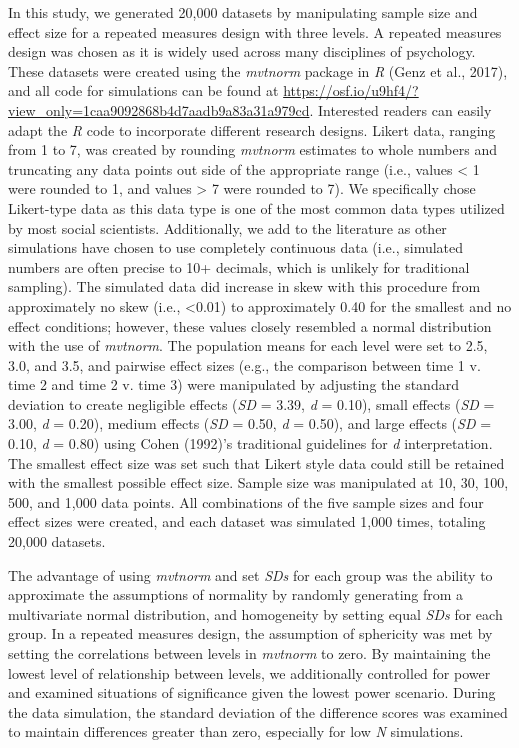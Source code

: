 \documentclass[english,mask,man]{apa6}
\theoremstyle{definition}
\theoremstyle{definition}
\theoremstyle{definition}
\theoremstyle{remark}
\begin{document}
In this study, we generated 20,000 datasets by manipulating sample size
and effect size for a repeated measures design with three levels. A
repeated measures design was chosen as it is widely used across many
disciplines of psychology. These datasets were created using the
\emph{mvtnorm} package in \emph{R} (Genz et al., 2017), and all code for
simulations can be found at
\url{https://osf.io/u9hf4/?view_only=1caa9092868b4d7aadb9a83a31a979cd}.
Interested readers can easily adapt the \emph{R} code to incorporate
different research designs. Likert data, ranging from 1 to 7, was
created by rounding \emph{mvtnorm} estimates to whole numbers and
truncating any data points out side of the appropriate range (i.e.,
values \textless{} 1 were rounded to 1, and values \textgreater{} 7 were
rounded to 7). We specifically chose Likert-type data as this data type
is one of the most common data types utilized by most social scientists.
Additionally, we add to the literature as other simulations have chosen
to use completely continuous data (i.e., simulated numbers are often
precise to 10+ decimals, which is unlikely for traditional sampling).
The simulated data did increase in skew with this procedure from
approximately no skew (i.e., \textless{}0.01) to approximately 0.40 for
the smallest and no effect conditions; however, these values closely
resembled a normal distribution with the use of \emph{mvtnorm}. The
population means for each level were set to 2.5, 3.0, and 3.5, and
pairwise effect sizes (e.g., the comparison between time 1 v. time 2 and
time 2 v. time 3) were manipulated by adjusting the standard deviation
to create negligible effects (\emph{SD} = 3.39, \emph{d} = 0.10), small
effects (\emph{SD} = 3.00, \emph{d} = 0.20), medium effects (\emph{SD} =
0.50, \emph{d} = 0.50), and large effects (\emph{SD} = 0.10, \emph{d} =
0.80) using Cohen (1992)'s traditional guidelines for \emph{d}
interpretation. The smallest effect size was set such that Likert style
data could still be retained with the smallest possible effect size.
Sample size was manipulated at 10, 30, 100, 500, and 1,000 data points.
All combinations of the five sample sizes and four effect sizes were
created, and each dataset was simulated 1,000 times, totaling 20,000
datasets.

The advantage of using \emph{mvtnorm} and set \emph{SDs} for each group
was the ability to approximate the assumptions of normality by randomly
generating from a multivariate normal distribution, and homogeneity by
setting equal \emph{SDs} for each group. In a repeated measures design,
the assumption of sphericity was met by setting the correlations between
levels in \emph{mvtnorm} to zero. By maintaining the lowest level of
relationship between levels, we additionally controlled for power and
examined situations of significance given the lowest power scenario.
During the data simulation, the standard deviation of the difference
scores was examined to maintain differences greater than zero,
especially for low \emph{N} simulations.
\end{document}
